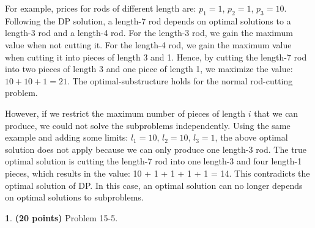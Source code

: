 \documentclass[11pt]{article}
\theoremstyle{definition}
\theoremstyle{theorem}
\newtheorem{prob}{}
\begin{document}
For example, prices for rods of different length are: $p_1 = 1$, $p_2 = 1$, $p_3 = 10$. Following the DP solution, a length-7 rod depends on optimal solutions to a length-3 rod and a length-4 rod. For the length-3 rod, we gain the maximum value when not cutting it. For the length-4 rod, we gain the maximum value when cutting it into pieces of length 3 and 1. Hence, by cutting the length-7 rod into two pieces of length 3 and one piece of length 1, we maximize the value: $10 + 10 + 1 = 21$. The optimal-substructure holds for the normal rod-cutting problem. 

However, if we restrict the maximum number of pieces of length $i$ that we can produce, we could not solve the subproblems independently. Using the same example and adding some limits: $l_1 = 10$, $l_2 = 10$, $l_3 = 1$, the above optimal solution does not apply because we can only produce one length-3 rod. The true optimal solution is cutting the length-7 rod into one length-3 and four length-1 pieces, which results in the value: 10 + 1 + 1 + 1 + 1 = 14. This contradicts the optimal solution of DP. In this case, an optimal solution can no longer depends on optimal solutions to subproblems.


\newpage
\begin{prob} \textbf{(20 points)} Problem 15-5.
\end{prob}
\end{document}
